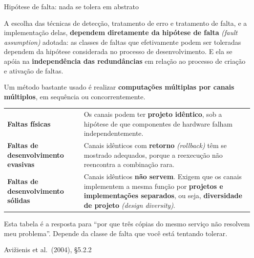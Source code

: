 \documentclass{beamer}
\newcommand{\en}[1]{{\color{depCinza}\textit{#1}}}
\newcommand{\sect}[1]{\par\smallskip\hfill{\tiny\color{black!55}Avi\v{z}ienis et al.\ (2004), #1}}
\begin{document}
\begin{frame}{Hip\'otese de falta: nada se tolera em abstrato}
    \footnotesize
    \begin{defi}
        \scriptsize
        A escolha das t\'ecnicas de detec\c{c}\~ao, tratamento de erro e tratamento de falta, e a implementa\c{c}\~ao delas, \textbf{dependem diretamente da hip\'otese de falta} \en{(fault assumption) } adotada: as classes de faltas que efetivamente podem ser toleradas dependem da hip\'otese considerada no processo de desenvolvimento. E ela se ap\'oia na \textbf{independ\^encia das redund\^ancias} em rela\c{c}\~ao ao processo de cria\c{c}\~ao e ativa\c{c}\~ao de faltas.
    \end{defi}
    \medskip
    Um m\'etodo bastante usado \'e realizar \textbf{computa\c{c}\~oes m\'ultiplas por canais m\'ultiplos}, em sequ\^encia ou concorrentemente.
    \medskip
    \begin{tabularx}{\linewidth}{@{}p{4.2cm} >{\raggedright\arraybackslash}X@{}}
        \toprule
        \textbf{Faltas f\'isicas} & Os canais podem ter \textbf{projeto id\^entico}, sob a hip\'otese de que componentes de hardware falham independentemente. \\
        \addlinespace
        \textbf{Faltas de desenvolvimento evasivas} & Canais id\^enticos com \textbf{retorno} \en{(rollback)} t\^em se mostrado adequados, porque a reexecu\c{c}\~ao n\~ao reencontra a combina\c{c}\~ao rara. \\
        \addlinespace
        \textbf{Faltas de desenvolvimento s\'olidas} & Canais id\^enticos \textbf{n\~ao servem}. Exigem que os canais implementem a mesma fun\c{c}\~ao por \textbf{projetos e implementa\c{c}\~oes separados}, ou seja, \textbf{diversidade de projeto} \en{(design diversity)}. \\
        \bottomrule
    \end{tabularx}
    \medskip
    \begin{ancora}
        \footnotesize
        Esta tabela \'e a resposta para ``por que tr\^es c\'opias do mesmo servi\c{c}o n\~ao resolvem meu problema''. Depende da classe de falta que voc\^e est\'a tentando tolerar.
    \end{ancora}
    \sect{\S5.2.2}
\end{frame}
\end{document}
